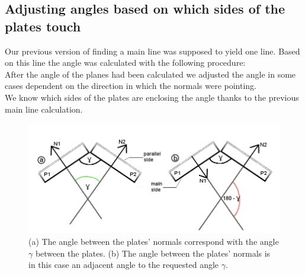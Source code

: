 \documentclass[../ClassicThesis.tex]{subfiles}
\begin{document}
\subsection{Adjusting angles based on which sides of the plates touch}
Our previous version of finding a main line was supposed to yield one line. Based on this line the angle was calculated with the following procedure:\\ 
After the angle of the planes had been calculated we adjusted the angle in some cases dependent on the direction in which the normals were pointing. \\
We know which sides of the plates are enclosing the angle thanks to the previous main line calculation.
\begin{figure}[h]

\includegraphics[width= 1\columnwidth]{Images/anglesExamplesSmall.png}
\caption{(a) The angle between the plates' normals correspond with the angle $\gamma$ between the plates. (b) The angle between the plates' normals is in this case an adjacent angle to the requested angle $\gamma$.}
\end{figure}
\end{document}
